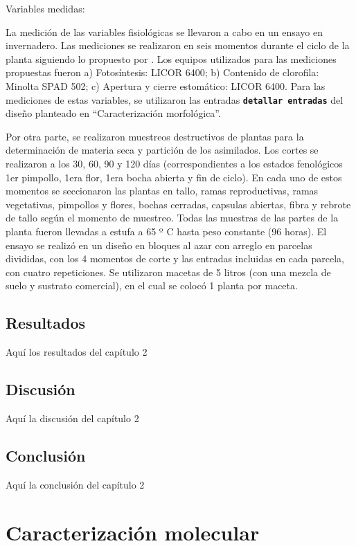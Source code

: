 \documentclass[12pt,oneside]{reedthesis}
\begin{document}
Variables medidas:

La medición de las variables fisiológicas se llevaron a cabo en un ensayo en invernadero. Las mediciones se realizaron en seis momentos durante el ciclo de la planta siguiendo lo propuesto por \autocite{luo2017}. Los equipos utilizados para las mediciones propuestas fueron a) Fotosíntesis: LICOR 6400; b) Contenido de clorofila: Minolta SPAD 502; c) Apertura y cierre estomático: LICOR 6400. Para las mediciones de estas variables, se utilizaron las entradas \textbf{\texttt{detallar\ entradas}} del diseño planteado en ``Caracterización morfológica''.

Por otra parte, se realizaron muestreos destructivos de plantas para la determinación de materia seca y partición de los asimilados. Los cortes se realizaron a los 30, 60, 90 y 120 días (correspondientes a los estados fenológicos 1er pimpollo, 1era flor, 1era bocha abierta y fin de ciclo). En cada uno de estos momentos se seccionaron las plantas en tallo, ramas reproductivas, ramas vegetativas, pimpollos y flores, bochas cerradas, capsulas abiertas, fibra y rebrote de tallo según el momento de muestreo. Todas las muestras de las partes de la planta fueron llevadas a estufa a 65 º C hasta peso constante (96 horas). El ensayo se realizó en un diseño en bloques al azar con arreglo en parcelas divididas, con los 4 momentos de corte y las entradas incluidas en cada parcela, con cuatro repeticiones. Se utilizaron macetas de 5 litros (con una mezcla de suelo y sustrato comercial), en el cual se colocó 1 planta por maceta.

\section{Resultados}\label{resultados-1}

Aquí los resultados del capítulo 2

\section{Discusión}\label{discusiuxf3n-1}

Aquí la discusión del capítulo 2

\section{Conclusión}\label{conclusiuxf3n-1}

Aquí la conclusión del capítulo 2

\chapter{Caracterización molecular}\label{ref-labels}
\end{document}

